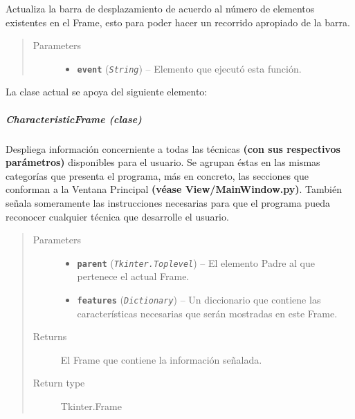 \documentclass[class=report, crop=false]{standalone}
\begin{document}
\begin{fulllineitems}
\begin{fulllineitems}
Actualiza la barra de desplazamiento de acuerdo al 
número de elementos existentes en el Frame, esto 
para poder hacer un recorrido apropiado de la barra.
\begin{quote}\begin{description}
\item[{Parameters}] \leavevmode\begin{itemize}
\item \textbf{\texttt{event}} (\emph{\texttt{String}}) -- Elemento que ejecutó esta función.
\end{itemize}
\end{description}\end{quote}

\end{fulllineitems}

\end{fulllineitems}

La clase actual se apoya del siguiente elemento:

\subparagraph{CharacteristicFrame (clase)}
\label{sec:a_3_3_2_3_2_1}
\begin{fulllineitems}


\begin{DUlineblock}{0em}
\item[] Despliega información concerniente a todas las técnicas 
\textbf{(con sus respectivos parámetros)} disponibles para el usuario.\break
Se agrupan éstas en las mismas categorías que presenta el programa,
más en concreto, las secciones que conforman a la Ventana Principal 
\textbf{(véase View/}\break\textbf{MainWindow.py)}.\break
También señala someramente las instrucciones necesarias para que el
programa pueda reconocer cualquier técnica que desarrolle el usuario.
\end{DUlineblock}

\begin{quote}\begin{description}
\item[{Parameters}] \leavevmode\begin{itemize}
\item \textbf{\texttt{parent}} (\emph{\texttt{Tkinter.Toplevel}}) -- El elemento Padre al que pertenece el actual Frame.
\item \textbf{\texttt{features}} (\emph{\texttt{Dictionary}}) -- Un diccionario que contiene las características necesarias que serán mostradas en este Frame.
\end{itemize}

\item[{Returns}] \leavevmode
El Frame que contiene la información señalada.
\item[{Return type}] \leavevmode
Tkinter.Frame
\end{description}\end{quote}


\end{fulllineitems}
\end{document}
